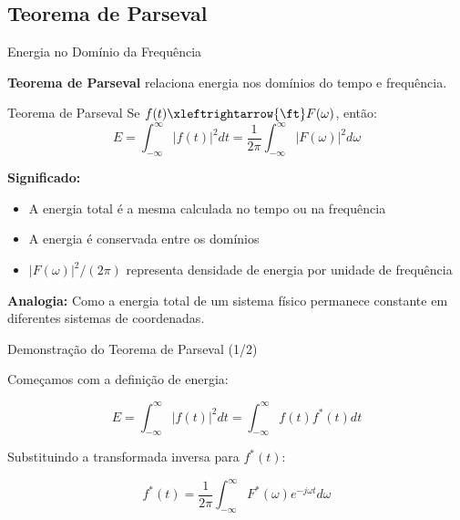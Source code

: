 
\subsection{Teorema de Parseval}

\begin{frame}{Energia no Domínio da Frequência}

\textbf{Teorema de Parseval} relaciona energia nos domínios do tempo e frequência.

\begin{block}{Teorema de Parseval}
Se $f(t) \xleftrightarrow{\ft} F(\omega)$, então:
\[
E = \int_{-\infty}^{\infty} |f(t)|^2 dt = \frac{1}{2\pi} \int_{-\infty}^{\infty} |F(\omega)|^2 d\omega
\]
\end{block}

\textbf{Significado:}

\begin{itemize}
\item A energia total é a mesma calculada no tempo ou na frequência
\item A energia é conservada entre os domínios
\item $|F(\omega)|^2/(2\pi)$ representa densidade de energia por unidade de frequência
\end{itemize}

\vspace{0.1cm}

\textbf{Analogia:} Como a energia total de um sistema físico permanece constante em diferentes sistemas de coordenadas.

\end{frame}


\begin{frame}{Demonstração do Teorema de Parseval (1/2)}

Começamos com a definição de energia:

\[
E = \int_{-\infty}^{\infty} |f(t)|^2 dt = \int_{-\infty}^{\infty} f(t) f^*(t) dt
\]

Substituindo a transformada inversa para $f^*(t)$:

\[
f^*(t) = \frac{1}{2\pi} \int_{-\infty}^{\infty} F^*(\omega) e^{-j\omega t} d\omega
\]

\end{frame}


